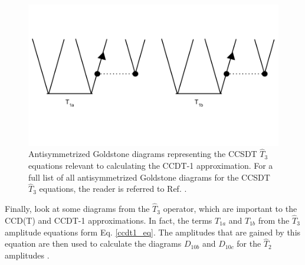 \begin{figure}
    \centering
    \includegraphics[scale=0.25]{Images/Chapter3/Relevant T3.png}
    \caption{Antisymmetrized Goldstone diagrams representing the CCSDT $\hat{T}_3$ equations relevant to calculating the CCDT-1 approximation. For a full list of all antisymmetrized Goldstone diagrams for the CCSDT $\hat{T}_3$ equations, the reader is referred to Ref. \cite{Ref21}.}
    \label{fig:my_label}
\end{figure}

Finally, look at some diagrams from the $\hat{T}_3$ operator, which are important to the CCD(T) and CCDT-1 approximations. In fact, the terms $T_{1a}$ and $T_{1b}$ from the $\hat{T}_3$ amplitude equations form  Eq. \ref{ccdt1_eq}.  The amplitudes that are gained by this equation are then used to calculate the diagrams $D_{10b}$ and $D_{10c}$ for the $\hat{T}_2$ amplitudes \cite{Ref156}.